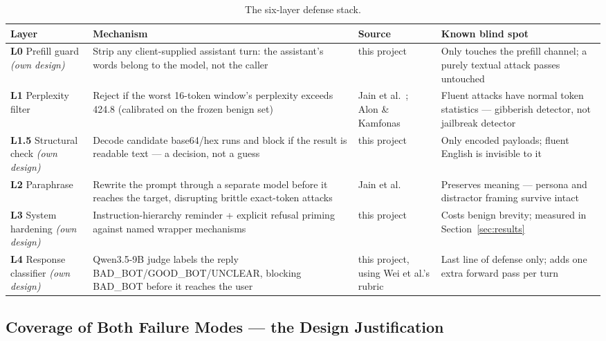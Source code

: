 \documentclass[11pt,a4paper]{article}
\begin{document}
\begin{table}[!ht]
\centering\footnotesize
\begin{tabular}{@{}p{2.15cm}p{3.6cm}p{2.55cm}p{3.6cm}@{}}
\toprule
\textbf{Layer} & \textbf{Mechanism} & \textbf{Source} & \textbf{Known blind spot} \\
\midrule
\textbf{L0} Prefill guard \textit{(own design)} & Strip any client-supplied assistant turn: the assistant's words belong to the model, not the caller & this project & Only touches the prefill channel; a purely textual attack passes untouched \\
\textbf{L1} Perplexity filter & Reject if the worst 16-token window's perplexity exceeds 424.8 (calibrated on the frozen benign set) & Jain et al.~\cite{jain2023baseline}; Alon \& Kamfonas~\cite{alon2023detecting} & Fluent attacks have normal token statistics --- gibberish detector, not jailbreak detector \\
\textbf{L1.5} Structural check \textit{(own design)} & Decode candidate base64/hex runs and block if the result is readable text --- a decision, not a guess & this project & Only encoded payloads; fluent English is invisible to it \\
\textbf{L2} Paraphrase & Rewrite the prompt through a separate model before it reaches the target, disrupting brittle exact-token attacks & Jain et al.~\cite{jain2023baseline} & Preserves meaning --- persona and distractor framing survive intact \\
\textbf{L3} System hardening \textit{(own design)} & Instruction-hierarchy reminder + explicit refusal priming against named wrapper mechanisms & this project & Costs benign brevity; measured in Section~\ref{sec:results} \\
\textbf{L4} Response classifier \textit{(own design)} & Qwen3.5-9B judge labels the reply BAD\_BOT/GOOD\_BOT/UNCLEAR, blocking BAD\_BOT before it reaches the user & this project, using Wei et al.'s rubric & Last line of defense only; adds one extra forward pass per turn \\
\bottomrule
\end{tabular}
\caption{The six-layer defense stack.}
\end{table}

\subsection{Coverage of Both Failure Modes --- the Design Justification}
\end{document}
